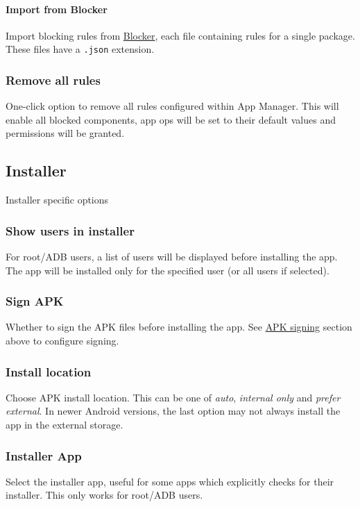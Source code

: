 \paragraph{Import from Blocker} Import blocking rules from \href{https://github.com/lihenggui/blocker}{Blocker}, each
file containing rules for a single package. These files have a \texttt{.json} extension.

\subsubsection{Remove all rules}
One-click option to remove all rules configured within App Manager. This will enable all blocked components, app ops
will be set to their default values and permissions will be granted.

\subsection{Installer}\label{subsec:installer}
Installer specific options

\subsubsection{Show users in installer}
For root/ADB users, a list of users will be displayed before installing the app. The app will be installed only for the
specified user (or all users if selected).

\subsubsection{Sign APK}
Whether to sign the APK files before installing the app. See \hyperref[subsec:apk-signing]{APK signing} section above to
configure signing.

\subsubsection{Install location}
Choose APK install location. This can be one of \textit{auto}, \textit{internal only} and \textit{prefer external}.
In newer Android versions, the last option may not always install the app in the external storage.

\subsubsection{Installer App}
Select the installer app, useful for some apps which explicitly checks for their installer. This only works for
root/ADB users.


